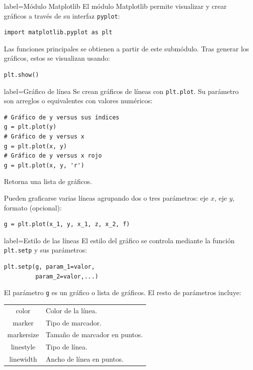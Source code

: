 \documentclass[10pt]{article}
\begin{document}
\begin{multicols*}{3}
\begin{contentbox}{label=Módulo Matplotlib}
    El módulo Matplotlib permite visualizar y crear gráficos a través de su interfaz \texttt{pyplot}:
    
\begin{lstlisting}
import matplotlib.pyplot as plt
\end{lstlisting}

    Las funciones principales se obtienen a partir de este submódulo. Tras generar los gráficos, estos se visualizan usando:
\begin{lstlisting}
plt.show()
\end{lstlisting}
\end{contentbox}

\begin{contentbox}{label=Gráfico de línea}
    Se crean gráficos de líneas con \lstinline!plt.plot!. Su parámetro son arreglos o equivalentes con valores numéricos:
    
\begin{lstlisting}
# Gráfico de y versus sus índices
g = plt.plot(y)
# Gráfico de y versus x
g = plt.plot(x, y)
# Gráfico de y versus x rojo
g = plt.plot(x, y, 'r')
\end{lstlisting}
    
    Retorna una lista de gráficos.
    
    Pueden graficarse varias líneas agrupando dos o tres parámetros: eje $x$, eje $y$, formato (opcional):
\begin{lstlisting}
g = plt.plot(x_1, y, x_1, z, x_2, f)
\end{lstlisting}
\end{contentbox}

\begin{contentbox}{label=Estilo de las líneas}
    El estilo del gráfico se controla mediante la función \lstinline!plt.setp! y sus parámetros:
\begin{lstlisting}
plt.setp(g, param_1=valor,
         param_2=valor,...)
\end{lstlisting}
    El parámetro \lstinline!g! es un gráfico o lista de gráficos. El resto de parámetros incluye:
    
    \begin{tabular}{C|p{0.5\textwidth}}
        color & Color de la línea. \\
        marker & Tipo de marcador. \\
        markersize & Tamaño de marcador en puntos. \\
        linestyle & Tipo de línea. \\
        linewidth & Ancho de línea en puntos.
    \end{tabular}


\end{contentbox}
\end{multicols*}
\end{document}
